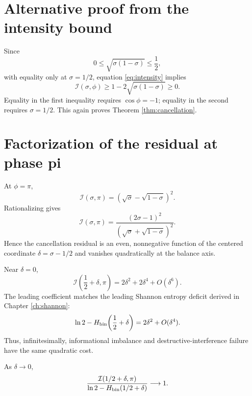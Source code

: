 \section{Alternative proof from the intensity bound}
Since
\begin{equation}
0\leq\sqrt{\sigma(1-\sigma)}\leq\frac12,
\end{equation}
with equality only at $\sigma=1/2$, equation \eqref{eq:intensity} implies
\begin{equation}
\mathcal I(\sigma,\phi)
\geq 1-2\sqrt{\sigma(1-\sigma)}\geq0.
\end{equation}
Equality in the first inequality requires $\cos\phi=-1$; equality in the second requires $\sigma=1/2$. This again proves Theorem \ref{thm:cancellation}.

\section{Factorization of the residual at phase pi}
At $\phi=\pi$,
\begin{equation}
\mathcal I(\sigma,\pi)
=\left(\sqrt{\sigma}-\sqrt{1-\sigma}\right)^2.
\end{equation}
Rationalizing gives
\begin{equation}
\mathcal I(\sigma,\pi)
=\frac{(2\sigma-1)^2}{\left(\sqrt{\sigma}+\sqrt{1-\sigma}\right)^2}.
\label{eq:intensity-delta}
\end{equation}
Hence the cancellation residual is an even, nonnegative function of the centered coordinate $\delta=\sigma-1/2$ and vanishes quadratically at the balance axis.

Near $\delta=0$,
\begin{equation}
\mathcal I\!\left(\frac12+\delta,\pi\right)
=2\delta^2+2\delta^4+O(\delta^6).
\end{equation}
The leading coefficient matches the leading Shannon entropy deficit derived in Chapter \ref{ch:shannon}:
\begin{equation}
\ln2-H_{\mathrm{bin}}\!\left(\frac12+\delta\right)
=2\delta^2+O(\delta^4).
\end{equation}
Thus, infinitesimally, informational imbalance and destructive-interference failure have the same quadratic cost.

\begin{proposition}
As $\delta\to0$,
\begin{equation}
\frac{\mathcal I(1/2+\delta,\pi)}{\ln2-H_{\mathrm{bin}}(1/2+\delta)}\longrightarrow1.
\end{equation}
\end{proposition}

